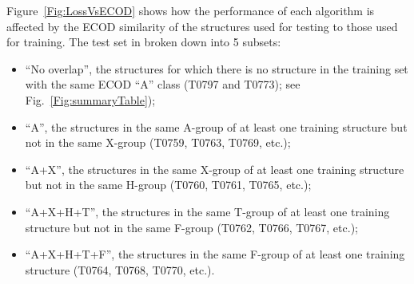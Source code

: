\documentclass[letter,10pt]{article}
\begin{document}
Figure~\ref{Fig:LossVsECOD} shows how the performance of each
algorithm is affected by the ECOD similarity of the structures used
for testing to those used for training. The test set in broken down
into 5 subsets:
\begin{itemize}
\item
``No overlap'', the structures for which there is no structure in the training set with 
the same ECOD ``A'' class (T0797 and T0773); see Fig.~\ref{Fig:summaryTable});
\item
``A'', the structures in the same A-group of at least one training
structure but not in the same X-group (T0759, T0763, T0769, etc.);
\item
``A+X'', the structures in the same X-group of at least one training
structure but not in the same H-group (T0760, T0761, T0765, etc.);
\item
``A+X+H+T'', the structures in the same T-group of at least one
training structure but not in the same F-group (T0762, T0766, T0767,
etc.);
\item
``A+X+H+T+F'', the structures in the same F-group of at least one
training structure (T0764, T0768, T0770, etc.).
\end{itemize}
%
%
%
%
%
\end{document}
